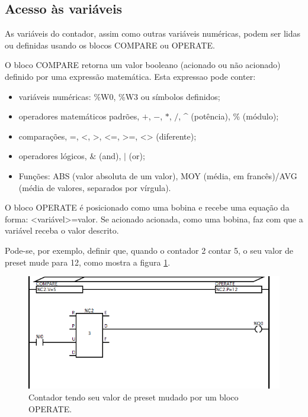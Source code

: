 \subsection{Acesso às variáveis}

As variáveis do contador, assim como outras variáveis numéricas, podem ser lidas ou definidas usando os blocos COMPARE ou OPERATE.

O bloco COMPARE retorna um valor booleano (acionado ou não acionado) definido por uma expressão matemática. Esta expressao pode conter:
\begin{itemize}
\item variáveis numéricas: \%W0, \%W3 ou símbolos definidos;
\item operadores matemáticos padrões, $+$, $-$, $*$, $/$, \^{} (potência), \% (módulo);
\item comparações, =, <, >, <=, >=, <> (diferente);
\item operadores lógicos, $\&$ (and), $|$ (or);
\item Funções: ABS (valor absoluta de um valor), MOY (média, em francês)/AVG (média de valores, separados por vírgula).
\end{itemize}

O bloco OPERATE é posicionado como uma bobina e recebe uma equação da forma: <variável>=valor. Se acionado acionada, como uma bobina, faz com que a variável receba o valor descrito.

Pode-se, por exemplo, definir que, quando o contador 2 contar 5, o seu valor de preset mude para 12, como mostra a figura \ref{fig:cl_contador_variaveis}.
\begin{figure}[hbt]
	\centering
	\includegraphics[width=\textwidth]{figuras/cl_contador_variaveis}
	\caption{Contador tendo seu valor de preset mudado por um bloco OPERATE.}
	\label{fig:cl_contador_variaveis}
\end{figure}

